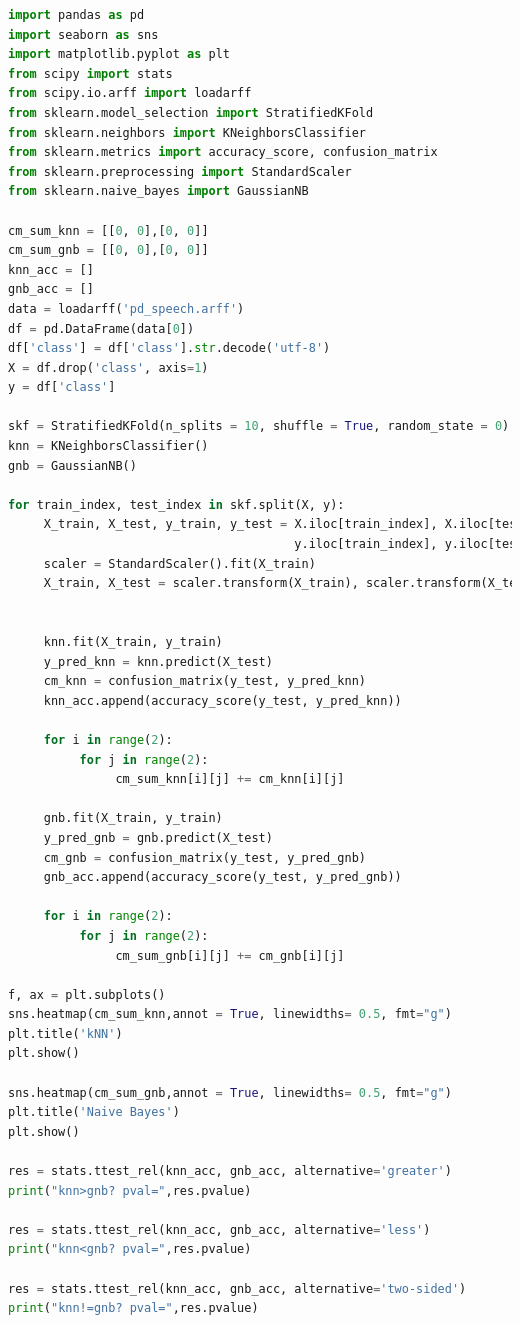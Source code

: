 \documentclass[12pt]{article}
\begin{document}
\begin{lstlisting}[language=Python]
import pandas as pd
import seaborn as sns
import matplotlib.pyplot as plt
from scipy import stats
from scipy.io.arff import loadarff
from sklearn.model_selection import StratifiedKFold
from sklearn.neighbors import KNeighborsClassifier
from sklearn.metrics import accuracy_score, confusion_matrix
from sklearn.preprocessing import StandardScaler
from sklearn.naive_bayes import GaussianNB

cm_sum_knn = [[0, 0],[0, 0]]
cm_sum_gnb = [[0, 0],[0, 0]]
knn_acc = []
gnb_acc = []
data = loadarff('pd_speech.arff')
df = pd.DataFrame(data[0])
df['class'] = df['class'].str.decode('utf-8')
X = df.drop('class', axis=1)
y = df['class']

skf = StratifiedKFold(n_splits = 10, shuffle = True, random_state = 0)
knn = KNeighborsClassifier()
gnb = GaussianNB()

for train_index, test_index in skf.split(X, y):
     X_train, X_test, y_train, y_test = X.iloc[train_index], X.iloc[test_index],\
                                        y.iloc[train_index], y.iloc[test_index]
     scaler = StandardScaler().fit(X_train)
     X_train, X_test = scaler.transform(X_train), scaler.transform(X_test)
    

     knn.fit(X_train, y_train)
     y_pred_knn = knn.predict(X_test)
     cm_knn = confusion_matrix(y_test, y_pred_knn)
     knn_acc.append(accuracy_score(y_test, y_pred_knn))

     for i in range(2):
          for j in range(2):
               cm_sum_knn[i][j] += cm_knn[i][j]

     gnb.fit(X_train, y_train)
     y_pred_gnb = gnb.predict(X_test)
     cm_gnb = confusion_matrix(y_test, y_pred_gnb)
     gnb_acc.append(accuracy_score(y_test, y_pred_gnb))

     for i in range(2):
          for j in range(2):
               cm_sum_gnb[i][j] += cm_gnb[i][j]

f, ax = plt.subplots()
sns.heatmap(cm_sum_knn,annot = True, linewidths= 0.5, fmt="g")
plt.title('kNN')
plt.show()

sns.heatmap(cm_sum_gnb,annot = True, linewidths= 0.5, fmt="g")
plt.title('Naive Bayes')
plt.show()

res = stats.ttest_rel(knn_acc, gnb_acc, alternative='greater')
print("knn>gnb? pval=",res.pvalue)

res = stats.ttest_rel(knn_acc, gnb_acc, alternative='less')
print("knn<gnb? pval=",res.pvalue)

res = stats.ttest_rel(knn_acc, gnb_acc, alternative='two-sided')
print("knn!=gnb? pval=",res.pvalue)
\end{lstlisting}
\end{document}
